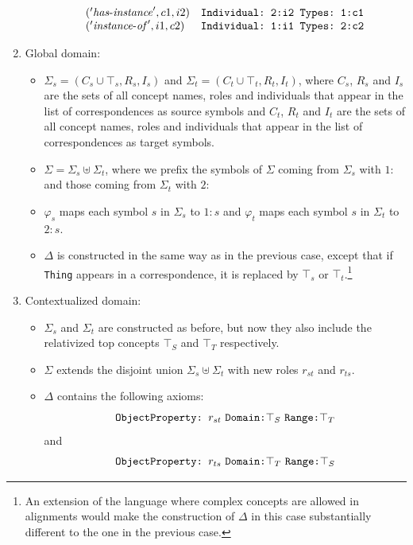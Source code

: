 \documentclass[10pt, a4paper]{isov2}
\begin{document}
\begin{enumerate}
\begin{itemize}
$$\begin{array}{ll}
            ('\mathit{has\text{-}instance}', c1, i2) & \verb+Individual: 2:i2 Types: 1:c1+\\
            ('\mathit{instance\text{-}of}', i1, c2) & \verb+Individual: 1:i1 Types: 2:c2+
          \end{array}$$         
  \end{itemize} 
\item Global domain: 
   \begin{itemize} 
   \item 
         $\Sigma_s = (C_s\cup{\top_s}, R_s, I_s)$ and $\Sigma_t = (C_t\cup{\top_t}, R_t,I_t)$,
         where $C_s$, $R_s$ and $I_s$ are the sets of all concept names, roles
         and individuals that appear in the list of correspondences as source symbols
         and $C_t$, $R_t$ and $I_t$ are the sets of all concept names, roles
         and individuals that appear in the list of correspondences as target symbols.
  \item $\Sigma = \Sigma_s \uplus \Sigma_t$, where we prefix the symbols of 
        $\Sigma$ coming from $\Sigma_s$ with $1:$ and those coming from
        $\Sigma_t$ with $2:$
  \item $\varphi_s$ maps each symbol $s$ in $\Sigma_s$ to $1:s$
        and $\varphi_t$ maps each symbol $s$ in $\Sigma_t$ to $2:s$.
  \item $\Delta$ is constructed in the same way as in the previous case, except
        that if \verb+Thing+ appears in a correspondence, it is replaced by
        $\top_s$ or $\top_t$.\footnote{An extension of the language where complex concepts are allowed in alignments would make the construction of $\Delta$ in this
        case substantially different to the one in the previous case.} 
   \end{itemize} 
        \item Contextualized domain:
  \begin{itemize} 
   \item $\Sigma_s$ and $\Sigma_t$ are constructed as before, but now they also
         include the relativized top concepts $\top_S$ and $\top_T$ respectively.
   \item $\Sigma$ extends the disjoint union $\Sigma_s \uplus \Sigma_t$ with 
         new roles $r_{st}$ and $r_{ts}$.
   \item $\Delta$ contains the following axioms: 
          $$ \verb+ObjectProperty: + r_{st}~ \verb+Domain:+ \top_S~ \verb+Range:+ \top_T$$
          and 
          $$ \verb+ObjectProperty: + r_{ts}~ \verb+Domain:+ \top_T~ \verb+Range:+ \top_S$$

\end{itemize}
\end{enumerate}
\end{document}
